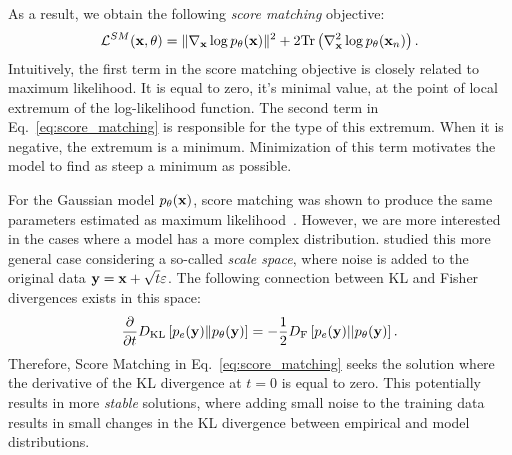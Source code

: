 As a result, we obtain the following \textit{score matching} objective:
\begin{equation}\label{eq:score_matching}
\begin{aligned}
\mathcal{L}^{SM}(\rvx, \theta)   =  \|\nabla_{\rvx}\log p_{\theta}(\rvx)\|^2 + 2\text{Tr}\left(\nabla^2_{\rvx}\log p_{\theta}(\rvx_n)\right).
\end{aligned}
\end{equation}
Intuitively, the first term in the score matching objective is closely related to maximum likelihood. It is equal to zero, it's minimal value, at the point of local extremum of the log-likelihood function. The second term in Eq.~\ref{eq:score_matching} is responsible for the type of this extremum. When it is negative, the extremum is a minimum. Minimization of this term motivates the model to find as steep a minimum as possible. 

For the Gaussian model $p_{\theta}({\mathbf{x}})$, score matching was shown to produce the same parameters estimated as maximum likelihood~\citep{hyvarinen2005estimation}. However, we are more interested in the cases where a model has a more complex distribution. \citet{lyu2009interpretation} studied this more general case considering a so-called \textit{scale space}, where noise is added to the original data ${\mathbf{y}} = {\mathbf{x}} + \sqrt{t}\varepsilon$. The following connection between KL and Fisher divergences exists in this space:
\begin{equation}
    \frac{\partial}{\partial t} D_{\mathrm{KL}}\left[p_e({\mathbf{y}})\|p_{\theta}({\mathbf{y}})\right] = -\frac12 D_{\text{F}}\left[p_{e}({\mathbf{y}})||p_{\theta}({\mathbf{y}})\right].
\end{equation}
\newline
Therefore, Score Matching in Eq.~\ref{eq:score_matching} seeks the solution where the derivative of the KL divergence at $t=0$ is equal to zero.
This potentially results in more \textit{stable} solutions, where adding small noise to the training data results in small changes in the KL divergence between empirical and model distributions. 



